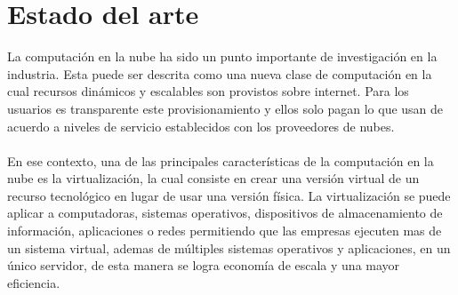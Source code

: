 
\chapter{Estado del arte}

\label{aprmaqvir}
La computación en la nube ha sido un punto importante de investigación en la industria. Esta puede ser descrita como una nueva clase de computación en la cual recursos dinámicos y escalables son provistos sobre internet. Para los usuarios es transparente este provisionamiento y ellos solo pagan lo que usan de acuerdo a niveles de servicio establecidos con los proveedores de nubes.\\
\\
En ese contexto, una de las principales características de la computación en la nube es la virtualización, la cual consiste en crear una versión virtual de un recurso tecnológico en lugar de usar una versión física. La virtualización se puede aplicar a computadoras, sistemas operativos, dispositivos de almacenamiento de información, aplicaciones o redes permitiendo que las empresas ejecuten mas de un sistema virtual, ademas de múltiples sistemas operativos y aplicaciones, en un único servidor, de esta manera se logra economía de escala y una mayor eficiencia.\\
\\
